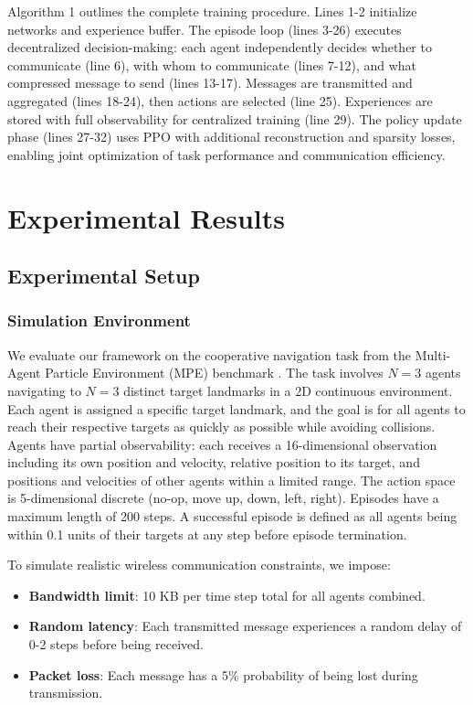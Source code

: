 \documentclass[10pt, twocolumn]{IEEEtran}
\begin{document}
Algorithm 1 outlines the complete training procedure. Lines 1-2 initialize networks and experience buffer. The episode loop (lines 3-26) executes decentralized decision-making: each agent independently decides whether to communicate (line 6), with whom to communicate (lines 7-12), and what compressed message to send (lines 13-17). Messages are transmitted and aggregated (lines 18-24), then actions are selected (line 25). Experiences are stored with full observability for centralized training (line 29). The policy update phase (lines 27-32) uses PPO with additional reconstruction and sparsity losses, enabling joint optimization of task performance and communication efficiency.

\section{Experimental Results}
\subsection{Experimental Setup}
\subsubsection{Simulation Environment}
We evaluate our framework on the cooperative navigation task from the Multi-Agent Particle Environment (MPE) benchmark \cite{sukhbaatar2016learning}. The task involves $N=3$ agents navigating to $N=3$ distinct target landmarks in a 2D continuous environment. Each agent is assigned a specific target landmark, and the goal is for all agents to reach their respective targets as quickly as possible while avoiding collisions. Agents have partial observability: each receives a 16-dimensional observation including its own position and velocity, relative position to its target, and positions and velocities of other agents within a limited range. The action space is 5-dimensional discrete (no-op, move up, down, left, right). Episodes have a maximum length of 200 steps. A successful episode is defined as all agents being within 0.1 units of their targets at any step before episode termination.

To simulate realistic wireless communication constraints, we impose:
\begin{itemize}
    \item \textbf{Bandwidth limit}: 10 KB per time step total for all agents combined.
    \item \textbf{Random latency}: Each transmitted message experiences a random delay of 0-2 steps before being received.
    \item \textbf{Packet loss}: Each message has a 5\% probability of being lost during transmission.
\end{itemize}
\end{document}
